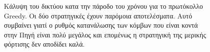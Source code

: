 \begin{figure}[H]
  \centering
  \caption{Κάλυψη του δικτύου κατα την πάροδο του χρόνου για το πρωτόκολλο Greedy. Οι δύο στρατηγικές έχουν παρόμοια αποτελέσματα. Αυτό
συμβαίνει γιατί ο ρυθμός κατανάλωσης των κόμβων που είναι κοντά στην Πηγή είναι πολύ μεγάλος και επομένως η στρατηγική της μερικής φόρτισης δεν αποδίδει καλά.}
  \label{fig:5_2exp_3_1}
\end{figure}

